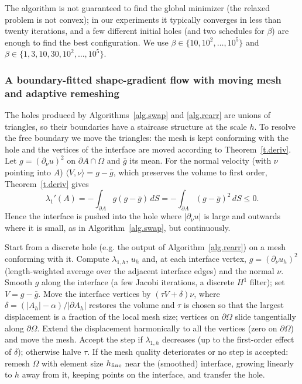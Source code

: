 \documentclass[11pt]{amsart}
\theoremstyle{remark}
\numberwithin{equation}{section}
\begin{document}
The algorithm is not guaranteed to find the global minimizer (the relaxed problem is not convex); in our experiments it typically converges in less than twenty iterations, and a few different initial holes (and two schedules for $\beta$) are enough to find the best configuration. We use $\beta\in\{10,10^2,\dots,10^5\}$ and $\beta\in\{1,3,10,30,10^2,\dots,10^5\}$.

\subsubsection{A boundary-fitted shape-gradient flow with moving mesh and adaptive remeshing}
The holes produced by Algorithms~\ref{alg.swap} and \ref{alg.rearr} are unions of triangles, so their boundaries have a staircase structure at the scale $h$. To resolve the free boundary we move the triangles: the mesh is kept conforming with the hole and the vertices of the interface are moved according to Theorem~\ref{t.deriv}. Let $g=(\partial_\nu u)^2$ on $\partial A\cap\Omega$ and $\bar g$ its mean. For the normal velocity (with $\nu$ pointing into $A$) $\langle V,\nu\rangle=g-\bar g$, which preserves the volume to first order, Theorem~\ref{t.deriv} gives
\[
\lambda_1'(A)=-\int_{\partial A}g(g-\bar g)\,dS=-\int_{\partial A}(g-\bar g)^2\,dS\le0.
\]
Hence the interface is pushed into the hole where $|\partial_\nu u|$ is large and outwards where it is small, as in Algorithm~\ref{alg.swap}, but continuously.

\begin{algorithm}[h]
\caption{Shape-gradient flow with moving mesh and adaptive remeshing}\label{alg.flow}
\begin{algorithmic}[1]
\State Start from a discrete hole (e.g. the output of Algorithm~\ref{alg.rearr}) on a mesh conforming with it.
\State Compute $\lambda_{1,h}$, $u_h$ and, at each interface vertex, $g=(\partial_\nu u_h)^2$ (length-weighted average over the adjacent interface edges) and the normal $\nu$.
\State Smooth $g$ along the interface (a few Jacobi iterations, a discrete $H^1$ filter); set $V=g-\bar g$.
\State Move the interface vertices by $(\tau V+\delta)\nu$, where $\delta=(|A_h|-\alpha)/|\partial A_h|$ restores the volume and $\tau$ is chosen so that the largest displacement is a fraction of the local mesh size; vertices on $\partial\Omega$ slide tangentially along $\partial\Omega$.
\State Extend the displacement harmonically to all the vertices (zero on $\partial\Omega$) and move the mesh.
\State Accept the step if $\lambda_{1,h}$ decreases (up to the first-order effect of $\delta$); otherwise halve $\tau$.
\State If the mesh quality deteriorates or no step is accepted: remesh $\Omega$ with element size $h_{\rm fine}$ near the (smoothed) interface, growing linearly to $h$ away from it, keeping points on the interface, and transfer the hole.
\EndFor
\end{algorithmic}
\end{algorithm}
\end{document}
